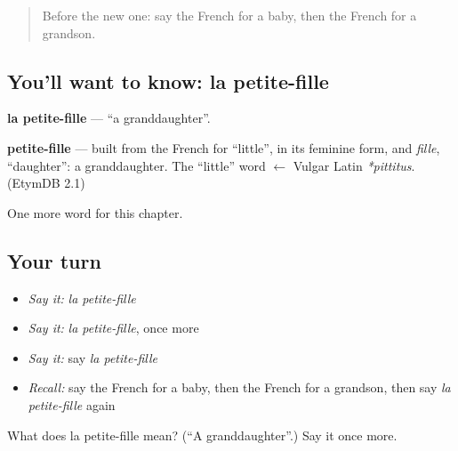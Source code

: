 \label{lesson:FR-C58-petite-fille}



\begin{quote}
Before the new one: say the French for a baby, then the French for a grandson.
\end{quote}

\subsection*{You'll want to know: la petite-fille}
\textbf{la petite-fille} — \textquotedblleft{}a granddaughter\textquotedblright{}.

\begin{cousinweb}
\textbf{petite-fille} — built from the French for \textquotedblleft{}little\textquotedblright{}, in its feminine form, and \emph{fille}, \textquotedblleft{}daughter\textquotedblright{}: a granddaughter. The \textquotedblleft{}little\textquotedblright{} word $\leftarrow$ Vulgar Latin \emph{*pittitus}. (EtymDB 2.1)
\end{cousinweb}

\begin{grammarlens}[title={What you've built}]
One more word for this chapter.
\end{grammarlens}

\subsection*{Your turn}
\begin{itemize}
\raggedright
  \item \emph{Say it:} \emph{la petite-fille}
  \item \emph{Say it:} \emph{la petite-fille}, once more
  \item \emph{Say it:} say \emph{la petite-fille}
  \item \emph{Recall:} say the French for a baby, then the French for a grandson, then say \emph{la petite-fille} again
\end{itemize}

\begin{tcolorbox}[breakable,colback=teal!4,colframe=teal!35!black,title={Before you move on}]
What does la petite-fille mean? (\textquotedblleft{}A granddaughter\textquotedblright{}.) Say it once more.
\end{tcolorbox}
